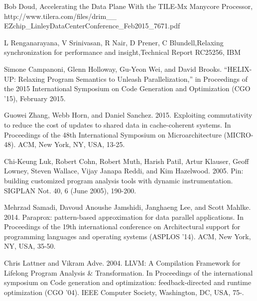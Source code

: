 \documentclass[12pt,conference]{IEEEtran}
\begin{document}
%
%
%
\begin{thebibliography}{11}

Bob Doud, Accelerating the Data Plane With the TILE-Mx Manycore Processor, 
http://www.tilera.com/files/drim\_\_ EZchip\_LinleyDataCenterConference\_Feb2015\_7671.pdf

L Renganarayana, V Srinivasan, R Nair, D Prener, C Blundell,Relaxing synchronization for performance and insight,Technical Report RC25256, IBM 

Simone Campanoni, Glenn Holloway, Gu-Yeon Wei, and David Brooks. “HELIX-UP: Relaxing
Program Semantics to Unleash Parallelization,” in Proceedings of the 2015 International
Symposium on Code Generation and Optimization (CGO ’15), February 2015.

Guowei Zhang, Webb Horn, and Daniel Sanchez. 2015. Exploiting commutativity to reduce the cost of updates to shared data in cache-coherent systems. In Proceedings of the 48th International Symposium on Microarchitecture (MICRO-48). ACM, New York, NY, USA, 13-25. 

Chi-Keung Luk, Robert Cohn, Robert Muth, Harish Patil, Artur Klauser, Geoff Lowney, Steven Wallace, Vijay Janapa Reddi, and Kim Hazelwood. 2005. Pin: building customized program analysis tools with dynamic instrumentation. SIGPLAN Not. 40, 6 (June 2005), 190-200.

Mehrzad Samadi, Davoud Anoushe Jamshidi, Janghaeng Lee, and Scott Mahlke. 2014. Paraprox: pattern-based approximation for data parallel applications. In Proceedings of the 19th international conference on Architectural support for programming languages and operating systems (ASPLOS '14). ACM, New York, NY, USA, 35-50. 

Chris Lattner and Vikram Adve. 2004. LLVM: A Compilation Framework for Lifelong Program Analysis \& Transformation. In Proceedings of the international symposium on Code generation and optimization: feedback-directed and runtime optimization (CGO '04). IEEE Computer Society, Washington, DC, USA, 75-.


\end{thebibliography}
\end{document}

